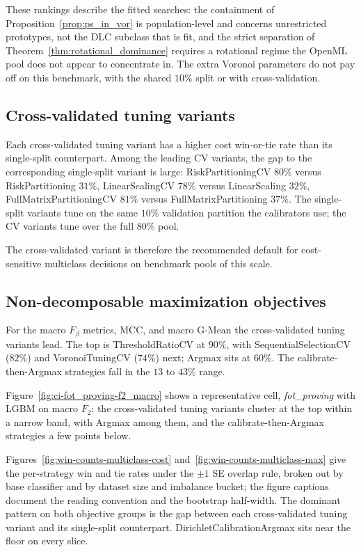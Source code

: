 These rankings describe the fitted searches: the containment of Proposition~\ref{prop:ps_in_vor} is population-level and concerns unrestricted prototypes, not the DLC subclass that is fit, and the strict separation of Theorem~\ref{thm:rotational_dominance} requires a rotational regime the OpenML pool does not appear to concentrate in. The extra Voronoi parameters do not pay off on this benchmark, with the shared $10\%$ split or with cross-validation.

\subsection{Cross-validated tuning variants}

Each cross-validated tuning variant has a higher cost win-or-tie rate than its single-split counterpart. Among the leading CV variants, the gap to the corresponding single-split variant is large: RiskPartitioningCV $80\%$ versus RiskPartitioning $31\%$, LinearScalingCV $78\%$ versus LinearScaling $32\%$, FullMatrixPartitioningCV $81\%$ versus FullMatrixPartitioning $37\%$. The single-split variants tune on the same $10\%$ validation partition the calibrators use; the CV variants tune over the full $80\%$ pool.

The cross-validated variant is therefore the recommended default for cost-sensitive multiclass decisions on benchmark pools of this scale.

\subsection{Non-decomposable maximization objectives}

For the macro $F_\beta$ metrics, MCC, and macro G-Mean the cross-validated tuning variants lead. The top is ThresholdRatioCV at $90\%$, with SequentialSelectionCV ($82\%$) and VoronoiTuningCV ($74\%$) next; Argmax sits at $60\%$. The calibrate-then-Argmax strategies fall in the $13$ to $43\%$ range.

Figure~\ref{fig:ci-fot_proving-f2_macro} shows a representative cell, \textit{fot\_proving} with LGBM on macro $F_2$: the cross-validated tuning variants cluster at the top within a narrow band, with Argmax among them, and the calibrate-then-Argmax strategies a few points below.



Figures~\ref{fig:win-counts-multiclass-cost} and~\ref{fig:win-counts-multiclass-max} give the per-strategy win and tie rates under the $\pm 1$ SE overlap rule, broken out by base classifier and by dataset size and imbalance bucket; the figure captions document the reading convention and the bootstrap half-width. The dominant pattern on both objective groups is the gap between each cross-validated tuning variant and its single-split counterpart. DirichletCalibrationArgmax sits near the floor on every slice.

